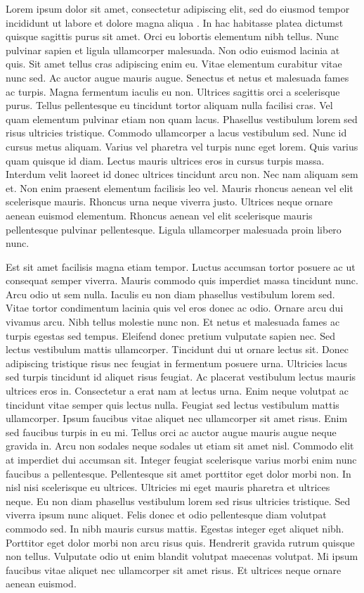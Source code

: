 \documentclass[11pt]{article}
\begin{document}
\par Lorem ipsum dolor sit amet, consectetur adipiscing elit, sed do eiusmod tempor incididunt ut labore et dolore magna aliqua \cite{Possantti2023}. In hac habitasse platea dictumst quisque sagittis purus sit amet. Orci eu lobortis elementum nibh tellus. Nunc pulvinar sapien et ligula ullamcorper malesuada. Non odio euismod lacinia at quis. Sit amet tellus cras adipiscing enim eu. Vitae elementum curabitur vitae nunc sed. Ac auctor augue mauris augue. Senectus et netus et malesuada fames ac turpis. Magna fermentum iaculis eu non. Ultrices sagittis orci a scelerisque purus. Tellus pellentesque eu tincidunt tortor aliquam nulla facilisi cras. Vel quam elementum pulvinar etiam non quam lacus. Phasellus vestibulum lorem sed risus ultricies tristique. Commodo ullamcorper a lacus vestibulum sed. Nunc id cursus metus aliquam. Varius vel pharetra vel turpis nunc eget lorem. Quis varius quam quisque id diam. Lectus mauris ultrices eros in cursus turpis massa. Interdum velit laoreet id donec ultrices tincidunt arcu non. Nec nam aliquam sem et. Non enim praesent elementum facilisis leo vel. Mauris rhoncus aenean vel elit scelerisque mauris. Rhoncus urna neque viverra justo. Ultrices neque ornare aenean euismod elementum. Rhoncus aenean vel elit scelerisque mauris pellentesque pulvinar pellentesque. Ligula ullamcorper malesuada proin libero nunc.

\par Est sit amet facilisis magna etiam tempor. Luctus accumsan tortor posuere ac ut consequat semper viverra. Mauris commodo quis imperdiet massa tincidunt nunc. Arcu odio ut sem nulla. Iaculis eu non diam phasellus vestibulum lorem sed. Vitae tortor condimentum lacinia quis vel eros donec ac odio. Ornare arcu dui vivamus arcu. Nibh tellus molestie nunc non. Et netus et malesuada fames ac turpis egestas sed tempus. Eleifend donec pretium vulputate sapien nec. Sed lectus vestibulum mattis ullamcorper. Tincidunt dui ut ornare lectus sit. Donec adipiscing tristique risus nec feugiat in fermentum posuere urna. Ultricies lacus sed turpis tincidunt id aliquet risus feugiat. Ac placerat vestibulum lectus mauris ultrices eros in. Consectetur a erat nam at lectus urna. Enim neque volutpat ac tincidunt vitae semper quis lectus nulla. Feugiat sed lectus vestibulum mattis ullamcorper. Ipsum faucibus vitae aliquet nec ullamcorper sit amet risus. Enim sed faucibus turpis in eu mi. Tellus orci ac auctor augue mauris augue neque gravida in. Arcu non sodales neque sodales ut etiam sit amet nisl. Commodo elit at imperdiet dui accumsan sit. Integer feugiat scelerisque varius morbi enim nunc faucibus a pellentesque. Pellentesque sit amet porttitor eget dolor morbi non. In nisl nisi scelerisque eu ultrices. Ultricies mi eget mauris pharetra et ultrices neque. Eu non diam phasellus vestibulum lorem sed risus ultricies tristique. Sed viverra ipsum nunc aliquet. Felis donec et odio pellentesque diam volutpat commodo sed. In nibh mauris cursus mattis. Egestas integer eget aliquet nibh. Porttitor eget dolor morbi non arcu risus quis. Hendrerit gravida rutrum quisque non tellus. Vulputate odio ut enim blandit volutpat maecenas volutpat. Mi ipsum faucibus vitae aliquet nec ullamcorper sit amet risus. Et ultrices neque ornare aenean euismod.
\end{document}
